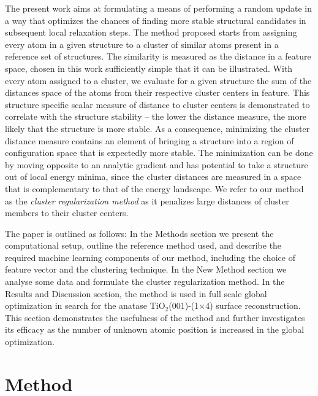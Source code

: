 \documentclass[aip,amsmath,amssymb,reprint]{revtex4-1}
\begin{document}
The present work aims at formulating a means of performing a random
update in a way that optimizes the chances of finding more stable
structural candidates in subsequent local relaxation steps. The method
proposed starts from assigning every atom in a given structure to a
cluster of similar atoms present in a reference set of structures.
The similarity is measured as the distance in a feature space, chosen in this work
sufficiently simple that it can be illustrated. With every atom
assigned to a cluster, we evaluate for a given structure the sum of
the distances space of the atoms from their respective
cluster centers in feature. This structure specific scalar measure of distance to
cluster centers is demonstrated to correlate with the structure
stability -- the lower the distance measure, the more likely that the
structure is more stable. As a consequence, minimizing the cluster distance measure
contains an element of bringing a structure into a region of
configuration space that is expectedly more stable. The minimization
can be done by moving opposite to an analytic gradient and has
potential to take a structure out of local energy minima, since the
cluster distances are measured in a space that is complementary to that of the
energy landscape. We refer to our method as the
\textit{cluster regularization method} as it penalizes large
distances of cluster members to their cluster centers.

The paper is outlined as follows: In the Methods section we present
the computational setup, outline the reference method used, and
describe the required machine learning components of our method,
including the choice of feature vector and the clustering technique.
In the New Method section we analyse some data and formulate the cluster
regularization method. In the Results and Discussion
section, the method is used in full scale global optimization in
search for the anatase TiO$_2$(001)-(1$\times$4) surface
reconstruction. This section demonstrates the usefulness of the method
and further investigates its efficacy as the number of unknown atomic
position is increased in the global optimization.

\section{Method}
\end{document}
